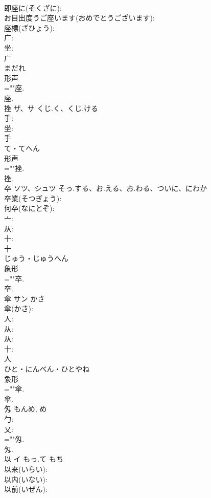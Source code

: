 \documentclass[8pt]{extreport}
\begin{document}
\begin{CJK}{UTF8}{min}
\\	即座に(そくざに): 
\\	お目出度うご座います(おめでとうございます): 
\\	座標(ざひょう): 
\\	广: 
\\	坐: 
\\	广	
\\	まだれ	
\\	形声 
\\	=""座.
\\	座.
\\	挫	ザ、サ	くじ.く、くじ.ける		
\\	手: 
\\	坐: 
\\	手	
\\	て・てへん	
\\	形声 
\\	=""挫.
\\	挫.
\\	卒	ソツ、シュツ	そっ.する、お.える、お.わる、ついに、にわか		
\\	卒業(そつぎょう): 
\\	何卒(なにとぞ): 
\\	亠: 
\\	从: 
\\	十: 
\\	十	
\\	じゅう・じゅうへん	
\\	象形 
\\	=""卒.
\\	卒.
\\	傘	サン	かさ		
\\	傘(かさ): 
\\	人: 
\\	从: 
\\	从: 
\\	十: 
\\	人	
\\	ひと・にんべん・ひとやね	
\\	象形 
\\	=""傘.
\\	傘.
\\	匁		もんめ, め				
\\	勹: 
\\	乂: 
\\	=""匁.
\\	匁.
\\	以	イ	もっ.て	もち	
\\	以来(いらい): 
\\	以内(いない): 
\\	以前(いぜん): 

\end{CJK}
\end{document}

